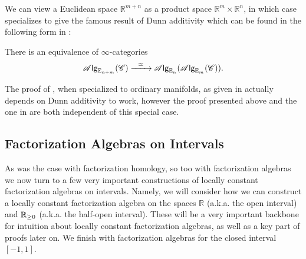 \documentclass[../text.tex]{subfiles}
\begin{document}
\begin{example}
    We can view a Euclidean space $\mathbb{R}^{m+n}$ as a product space $\mathbb{R}^m \times \mathbb{R}^n$, in which case  specializes to give the famous result of Dunn additivity \cite{dunn1988} which can be found in the following form in \cite{lurie_ha}:

    \begin{proposition}\label{prop:dunn_additivity}
        There is an equivalence of $\infty$-categories
        \begin{equation}
            \mathscr{A} \mathsf{lg}_{\mathbb{E}_{n + m}} (\mathscr{C}) \xrightarrow{\ \ \simeq \ \ } \mathscr{A} \mathsf{lg}_{\mathbb{E}_n} (\mathscr{A} \mathsf{lg}_{\mathbb{E}_m} (\mathscr{C})).
        \end{equation}
    \end{proposition}
\end{example}


\begin{remark}
    The proof of , when specialized to ordinary manifolds, as given in \cite{ginot2015} actually depends on Dunn additivity to work, however the proof presented above and the one in \cite{lurie_ha} are both independent of this special case. 
\end{remark}





\subsection{Factorization Algebras on Intervals}\label{ssec:lcfa_on_ints}

As was the case with factorization homology, so too with factorization algebras we now turn to a few very important constructions of locally constant factorization algebras on intervals. Namely, we will consider how we can construct a locally constant factorization algebra on the spaces $\mathbb{R}$ (a.k.a. the open interval) and $\mathbb{R}_{\geq 0}$ (a.k.a. the half-open interval). These will be a very important backbone for intuition about locally constant factorization algebras, as well as a key part of proofs later on. We finish with factorization algebras for the closed interval $[-1,1]$.
\end{document}
